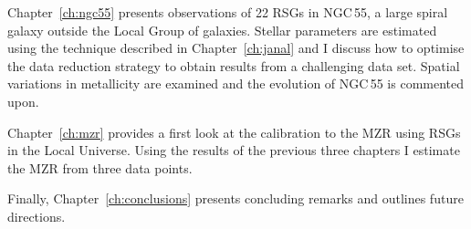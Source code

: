 Chapter~\ref{ch:ngc55} presents observations of 22 RSGs in NGC\,55, a large spiral galaxy outside the Local Group of galaxies.
Stellar parameters are estimated using the technique described in Chapter~\ref{ch:janal} and I discuss how to optimise the data reduction strategy to obtain results from a challenging data set.
Spatial variations in metallicity are examined and the evolution of NGC\,55 is commented upon.

Chapter~\ref{ch:mzr} provides a first look at the calibration to the MZR using RSGs in the Local Universe.
Using the results of the previous three chapters I estimate the MZR from three data points.

Finally, Chapter~\ref{ch:conclusions} presents concluding remarks and outlines future directions.

% 

